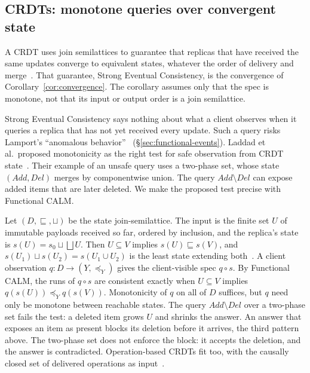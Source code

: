 \documentclass[sigconf]{cidr-2027}
\theoremstyle{remark}
\newcommand{\outrelpart}{extending\xspace}    %
\begin{document}
\subsection{CRDTs: monotone queries over convergent state}
\label{sec:crdt-instance}

A CRDT uses join semilattices to guarantee that replicas that have received the
same updates converge to equivalent states, whatever the order of delivery and
merge~\cite{shapiro2011crdt}. That guarantee, Strong Eventual Consistency, is
the convergence of Corollary~\ref{cor:convergence}. The corollary assumes only
that the spec is monotone, not that its input or output order is a join
semilattice.

\textcolor{reviewed}{Strong Eventual Consistency says nothing about what a client observes when it
queries a replica that has not yet received every update.} Such a query risks
Lamport's ``anomalous behavior''~\cite{lamport1978time}
(\S\ref{sec:functional-events}). \textcolor{reviewed}{Laddad et al.\ proposed monotonicity as the
right test for safe observation from CRDT state~\cite{laddad2022keep}.} Their
example of an unsafe query uses a two-phase set, whose state
$(\mathit{Add},\mathit{Del})$ merges by componentwise union. The query
$\mathit{Add}\setminus\mathit{Del}$ can expose added items that are later
deleted. We make the proposed test precise with Functional CALM.

Let $(D,\sqsubseteq,\sqcup)$ be the state join-semilattice. The input is the
finite set $U$ of immutable payloads received so far, ordered by inclusion, and
the replica's state is $s(U)=s_0\sqcup\bigsqcup U$. Then $U\subseteq V$
implies $s(U)\sqsubseteq s(V)$, and $s(U_1)\sqcup s(U_2)=s(U_1\cup U_2)$ is the
least state \outrelpart both~\cite{shapiro2011crdt}. A client observation
$q:D\to(Y,\preceq_Y)$ gives the client-visible spec $q\circ s$. By
Functional CALM, the runs of $q\circ s$ are consistent exactly when $U\subseteq V$ implies
$q(s(U))\preceq_Y q(s(V))$. Monotonicity of $q$ on all of $D$ suffices, but
$q$ need only be monotone between reachable states. The query $\mathit{Add}\setminus\mathit{Del}$ over a two-phase set fails the test: a deleted item grows $U$ and shrinks the answer. \textcolor{reviewed}{An answer that exposes an item as
present blocks its deletion before it arrives, the third pattern above.} \textcolor{reviewed}{The
two-phase set does not enforce the block: it accepts the deletion, and the
answer is contradicted.} Operation-based CRDTs fit too, with the causally closed set of
delivered operations as
input~\cite{shapiro2011crdt,burckhardt2014replicated,baquero2014operation,hellerstein2025turtles}.
\end{document}
